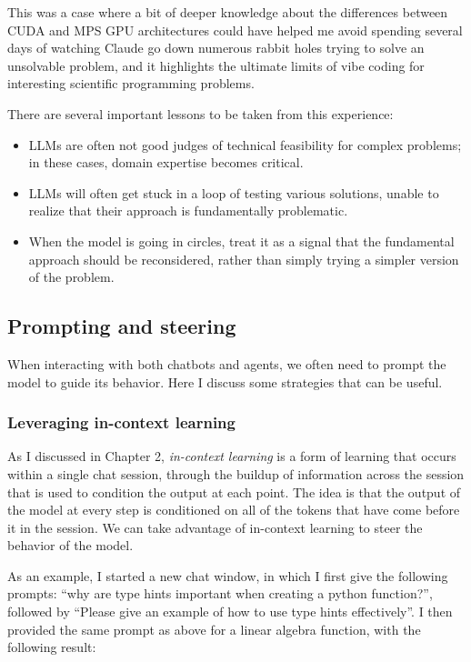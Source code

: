 This was a case where a bit of deeper knowledge about the differences between CUDA and MPS GPU architectures could have helped me avoid spending several days of watching Claude go down numerous rabbit holes trying to solve an unsolvable problem, and it highlights the ultimate limits of vibe coding for interesting scientific programming problems.

There are several important lessons to be taken from this experience:

\begin{itemize}
\item LLMs are often not good judges of technical feasibility for complex problems; in these cases, domain expertise becomes critical.
\item LLMs will often get stuck in a loop of testing various solutions, unable to realize that their approach is fundamentally problematic.
\item When the model is going in circles, treat it as a signal that the fundamental approach should be reconsidered, rather than simply trying a simpler version of the problem.
\end{itemize}

\subsection{Prompting and steering}

When interacting with both chatbots and agents, we often need to prompt the model to guide its behavior.  Here I discuss some strategies that can be useful.

\subsubsection{Leveraging in-context learning}

As I discussed in Chapter 2, \textit{in-context learning} is a form of learning that occurs within a single chat session, through the buildup of information across the session that is used to condition the output at each point.
The idea is that the output of the model at every step is conditioned on all of the tokens that have come before it in the session. We can take advantage of in-context learning to steer the behavior of the model.

As an example, I started a new chat window, in which I first give the following prompts: ``why are type hints important when creating a python function?'', followed by ``Please give an example of how to use type hints effectively''.
I then provided the same prompt as above for a linear algebra function, with the following result:

